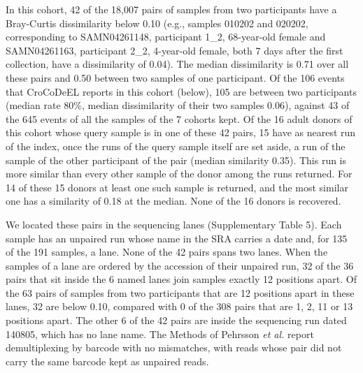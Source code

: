 \documentclass[11pt,a4paper]{article}
\begin{document}
In this cohort, 42 of the 18,007 pairs of samples from two participants have a Bray-Curtis dissimilarity below 0.10 (e.g., samples 010202 and 020202, corresponding to SAMN04261148, participant 1\_2, 68-year-old female and SAMN04261163, participant 2\_2, 4-year-old female, both 7 days after the first collection, have a dissimilarity of 0.04). The median dissimilarity is 0.71 over all these pairs and 0.50 between two samples of one participant. Of the 106 events that CroCoDeEL reports in this cohort (below), 105 are between two participants (median rate 80\%, median dissimilarity of their two samples 0.06), against 43 of the 645 events of all the samples of the 7 cohorts kept. Of the 16 adult donors of this cohort whose query sample is in one of these 42 pairs, 15 have as nearest run of the index, once the runs of the query sample itself are set aside, a run of the sample of the other participant of the pair (median similarity 0.35). This run is more similar than every other sample of the donor among the runs returned. For 14 of these 15 donors at least one such sample is returned, and the most similar one has a similarity of 0.18 at the median. None of the 16 donors is recovered.

We located these pairs in the sequencing lanes (Supplementary Table 5). Each sample has an unpaired run whose name in the SRA carries a date and, for 135 of the 191 samples, a lane. None of the 42 pairs spans two lanes. When the samples of a lane are ordered by the accession of their unpaired run, 32 of the 36 pairs that sit inside the 6 named lanes join samples exactly 12 positions apart. Of the 63 pairs of samples from two participants that are 12 positions apart in these lanes, 32 are below 0.10, compared with 0 of the 308 pairs that are 1, 2, 11 or 13 positions apart. The other 6 of the 42 pairs are inside the sequencing run dated 140805, which has no lane name. The Methods of Pehrsson \textit{et al.}\cite{pehrsson2016} report demultiplexing by barcode with no mismatches, with reads whose pair did not carry the same barcode kept as unpaired reads.
\end{document}
